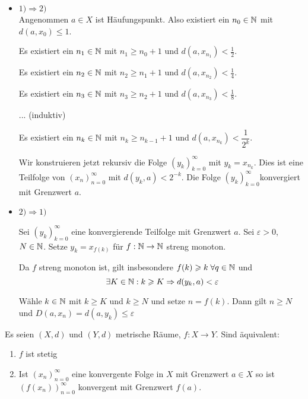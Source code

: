 \documentclass[main.tex]{subfiles}
\begin{document}
\begin{Beweis}
  \begin{itemize}
    \item $1) \Rightarrow 2)$\\
      Angenommen $a \in X$ ist Häufungspunkt. Also existiert ein $n_0 \in \mathbb{N}$ mit $d(a,x_0) \leq 1$.

      Es existiert ein $n_1 \in \mathbb{N}$ mit $n_1 \geq n_0 + 1$ und $d(a,x_{n_1}) < \frac{1}{2}$.

      Es existiert ein $n_2 \in \mathbb{N}$ mit $n_2 \geq n_1 + 1$ und $d(a,x_{n_2}) < \frac{1}{4}$.

      Es existiert ein $n_3 \in \mathbb{N}$ mit $n_3 \geq n_2 + 1$ und $d(a,x_{n_3}) < \frac{1}{8}$.

      ... (induktiv)

      Es existiert ein $n_k \in \mathbb{N}$ mit $n_k \geq n_{k-1} + 1$ und $d(a,x_{n_k}) < \dfrac{1}{2^k}$.

      Wir konstruieren jetzt rekursiv die Folge $(y_k)_{k=0}^\infty$ mit $y_k = x_{n_k}$. Dies ist eine Teilfolge von $(x_n)_{n=0}^\infty$ mit $d(y_k,a) < 2^{-k}$. Die Folge $(y_k)_{k=0}^\infty$konvergiert mit Grenzwert $a$.
    \item $2) \Rightarrow 1)$

      Sei $(y_k)_{k=0}^\infty$ eine konvergierende Teilfolge mit Grenzwert $a$. Sei $\varepsilon > 0$, $N \in \mathbb{N}$. Setze $y_k = x_{f(k)}$ für $f:\mathbb{N} \to \mathbb{N}$ streng monoton.

      Da $f$ streng monoton ist, gilt insbesondere $f(k) \geqslant k \;\forall q \in \mathbb{N}$ und
      $$\;\exists K \in \mathbb{N} : k \geqslant K \Rightarrow d(y_k, a) < \varepsilon$$

      Wähle $k \in \mathbb{N}$ mit $k \geq K$ und $k \geq N$ und setze $n = f(k)$. Dann gilt $n \geq N$ und $D(a,x_n) = d(a,y_k) \leq \varepsilon$
  \end{itemize}
\end{Beweis}

\begin{Theorem}
  Es seien $(X,d)$ und $(Y,d)$ metrische Räume, $f: X \to Y$. Sind äquivalent:
  \begin{enumerate}
    \item $f$ ist stetig
    \item Ist $(x_n)_{n=0}^\infty$  eine konvergente Folge in $X$ mit Grenzwert $a \in X$ so ist $(f(x_n))_{n = 0}^\infty$ konvergent mit Grenzwert $f(a)$.
  \end{enumerate}
\end{Theorem}
\end{document}
